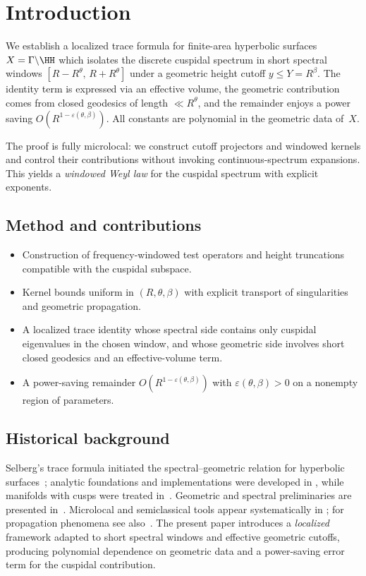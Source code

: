 \section{Introduction}

We establish a localized trace formula for finite-area hyperbolic
surfaces $X=\Gamma\backslash\HH$ which isolates the discrete cuspidal
spectrum in short spectral windows $[R-R^\theta,\,R+R^\theta]$
under a geometric height cutoff $y\le Y=R^\beta$. The identity term
is expressed via an effective volume, the geometric contribution
comes from closed geodesics of length $\ll R^\theta$, and the
remainder enjoys a power saving $O(R^{1-\varepsilon(\theta,\beta)})$.
All constants are polynomial in the geometric data of~$X$.

The proof is fully microlocal: we construct cutoff projectors and
windowed kernels and control their contributions without invoking
continuous-spectrum expansions. This yields a \emph{windowed Weyl law}
for the cuspidal spectrum with explicit exponents.

\subsection*{Method and contributions}
\begin{itemize}
  \item Construction of frequency-windowed test operators and height
        truncations compatible with the cuspidal subspace.
  \item Kernel bounds uniform in $(R,\theta,\beta)$ with explicit
        transport of singularities and geometric propagation.
  \item A localized trace identity whose spectral side contains only
        cuspidal eigenvalues in the chosen window, and whose geometric
        side involves short closed geodesics and an effective-volume term.
  \item A power-saving remainder $O(R^{1-\varepsilon(\theta,\beta)})$
        with $\varepsilon(\theta,\beta)>0$ on a nonempty region of
        parameters.
\end{itemize}

\subsection*{Historical background}
Selberg’s trace formula initiated the spectral–geometric relation
for hyperbolic surfaces~\cite{selberg1956}; analytic foundations and
implementations were developed in \cite{hejhal1976,hejhal1983},
while manifolds with cusps were treated in~\cite{mueller1983}.
Geometric and spectral preliminaries are presented in~\cite{buser1992}.
Microlocal and semiclassical tools appear systematically in
\cite{zworski2012,dyatlovzworski2019}; for propagation phenomena see
also~\cite{chazarain1974}. The present paper introduces a \emph{localized}
framework adapted to short spectral windows and effective geometric
cutoffs, producing polynomial dependence on geometric data and a
power-saving error term for the cuspidal contribution.

